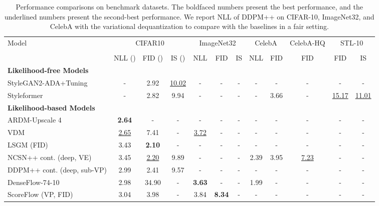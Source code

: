 \documentclass[nohyperref]{article}
\theoremstyle{plain}
\theoremstyle{definition}
\theoremstyle{remark}
\begin{document}
\begin{table*}
\centering
	\caption{Performance comparisons on benchmark datasets. The boldfaced numbers present the best performance, and the underlined numbers present the second-best performance. We report NLL of DDPM++ on CIFAR-10, ImageNet32, and CelebA with the variational dequantization \cite{song2021maximum} to compare with the baselines in a fair setting.}
	\label{tab:performances}
	\begin{adjustbox}{max width=\textwidth}
		\begin{tabular}{lccccccccccc}
			\toprule
			\multirow{3}{*}{Model} & \multicolumn{3}{c}{CIFAR10} & \multicolumn{3}{c}{ImageNet32} & \multicolumn{2}{c}{CelebA} & CelebA-HQ & \multicolumn{2}{c}{STL-10} \\
			& \multicolumn{3}{c}{} & \multicolumn{3}{c}{} & \multicolumn{2}{c}{} &  & \multicolumn{2}{c}{} \\
			& NLL () & FID () & IS () & NLL & FID & IS & NLL & FID & FID & FID & IS \\\midrule
			\multicolumn{12}{l}{\textbf{Likelihood-free Models}}\\
			StyleGAN2-ADA+Tuning \citep{karras2020training} & - & 2.92 & \underline{10.02} & - & - & - & - & - & - & - & - \\
			Styleformer \citep{park2021styleformer} & - & 2.82 & 9.94 & - & - & - & - & 3.66 & - & \underline{15.17} & \underline{11.01} \\
			\multicolumn{12}{l}{\textbf{Likelihood-based Models}}\\
			ARDM-Upscale 4 \citep{hoogeboom2021autoregressive} & \textbf{2.64} & - & - & - & - & - & - & - & - & - & - \\
			VDM \citep{kingma2021variational} & \underline{2.65} & 7.41 & - & \underline{3.72} & - & - & - & - & - & - & - \\
			LSGM (FID) \citep{vahdat2021score} & 3.43 & \textbf{2.10} & - & - & - & - & - & - & - & - & - \\
			NCSN++ cont. (deep, VE) \citep{song2020score} & 3.45 & \underline{2.20} & 9.89 & - & - & - & 2.39 & 3.95 & \underline{7.23} & - & - \\
			DDPM++ cont. (deep, sub-VP) \citep{song2020score} & 2.99 & 2.41 & 9.57 & - & - & - & - & - & - & - & - \\
			DenseFlow-74-10 \citep{grcic2021densely} & 2.98 & 34.90 & - & \textbf{3.63} & - & - & 1.99 & - & - & - & - \\
			ScoreFlow (VP, FID) \citep{song2021maximum} & 3.04 & 3.98 & - & 3.84 & \textbf{8.34} & - & - & - & - & - & - \\

\end{tabular}
\end{adjustbox}
\end{table*}
\end{document}
